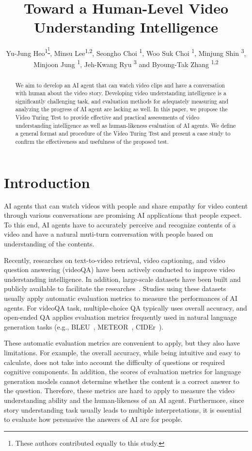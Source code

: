 \documentclass[letterpaper]{article} %
\title{Toward a Human-Level Video Understanding Intelligence}
\author {
Yu-Jung Heo\textsuperscript{\rm 1\thanks{These authors contributed equally to this study.}},
Minsu Lee\textsuperscript{\rm 1,2\footnotemark[1]},
Seongho Choi \textsuperscript{\rm 1},
Woo Suk Choi \textsuperscript{\rm 1},
Minjung Shin \textsuperscript{\rm 3},
Minjoon Jung \textsuperscript{\rm 1},
Jeh-Kwang Ryu \textsuperscript{\rm 3} and
Byoung-Tak Zhang \textsuperscript{\rm 1,2}\\
}
\begin{document}
\maketitle

\begin{abstract}
We aim to develop an AI agent that can watch video clips and have a conversation with human about the video story. Developing video understanding intelligence is a significantly challenging task, and evaluation methods for adequately measuring and analyzing the progress of AI agent are lacking as well.
In this paper, we propose the Video Turing Test to provide effective and practical assessments of video understanding intelligence as well as human-likeness evaluation of AI agents. We define a general format and procedure of the Video Turing Test and present a case study to confirm the effectiveness and usefulness of the proposed test.
\end{abstract}

\section{Introduction} %
AI agents that can watch videos with people and share empathy for video content through various conversations are promising AI applications that people expect. To this end, AI agents have to accurately perceive and recognize contents of a video and have a natural muti-turn conversation with people based on understanding of the contents.

Recently, researches on text-to-video retrieval, video captioning, and video question answering (videoQA) have been actively conducted to improve video understanding intelligence. In addition, large-scale datasets have been built and publicly available to facilitate the researches~\cite{alamri2019audio,lei2018tvqa,lei2020tvr,choi2021dramaqa}. Studies using these datasets usually apply automatic evaluation metrics to measure the performances of AI agents.
For videoQA task, multiple-choice QA typically uses overall accuracy, and open-ended QA applies evaluation metrics frequently used in natural language generation tasks (e.g., BLEU~\cite{papineni2002bleu}, METEOR~\cite{banerjee2005meteor}, CIDEr~\cite{vedantam2015cider}).

These automatic evaluation metrics are convenient to apply, but they also have limitations.
For example, the overall accuracy, while being intuitive and easy to calculate, does not take into account the difficulty of questions or required cognitive components.
In addition, the scores of evaluation metrics for language generation models cannot determine whether the content is a correct answer to the question.
Therefore, these metrics are hard to apply to measure the video understanding ability and the human-likeness of an AI agent.
Furthermore, since story understanding task usually leads to multiple interpretations, it is essential to evaluate how persuasive the answers of AI are for people.
\end{document}
